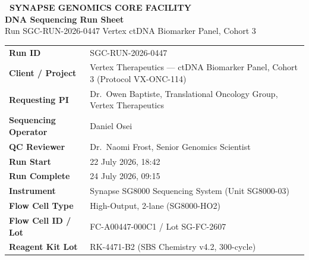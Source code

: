 
\thispagestyle{empty}


\vspace*{0.9cm}
\hspace{1.2cm}
\begin{minipage}{0.86\linewidth}
  {\color{white}\sffamily\footnotesize\bfseries\faDatabase\ SYNAPSE GENOMICS CORE FACILITY}\\[6pt]
  {\color{white}\sffamily\bfseries\fontsize{24}{28}\selectfont DNA Sequencing Run Sheet}\\[4pt]
  {\color{SeqRule}\sffamily\normalsize Run SGC-RUN-2026-0447 \textbullet{} Vertex ctDNA Biomarker Panel, Cohort 3}
\end{minipage}

\vspace{1.0cm}

\begin{infobox}
\begin{tabularx}{\linewidth}{@{} >{\bfseries\color{SeqVioletDark}}l X @{}}
Run ID              & SGC-RUN-2026-0447 \\
Client / Project    & Vertex Therapeutics — ctDNA Biomarker Panel, Cohort 3 (Protocol VX-ONC-114) \\
Requesting PI       & Dr.\ Owen Baptiste, Translational Oncology Group, Vertex Therapeutics \\
Sequencing Operator & Daniel Osei \\
QC Reviewer         & Dr.\ Naomi Frost, Senior Genomics Scientist \\
Run Start           & 22 July 2026, 18:42 \\
Run Complete        & 24 July 2026, 09:15 \\
Instrument          & Synapse SG8000 Sequencing System (Unit SG8000-03) \\
Flow Cell Type      & High-Output, 2-lane (SG8000-HO2) \\
Flow Cell ID / Lot  & FC-A00447-000C1 / Lot SG-FC-2607 \\
Reagent Kit Lot     & RK-4471-B2 (SBS Chemistry v4.2, 300-cycle) \\
\end{tabularx}
\end{infobox}

